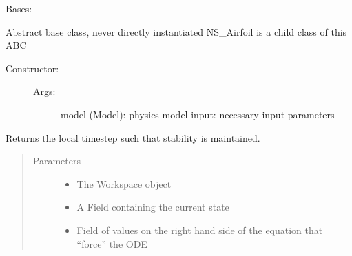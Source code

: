 \documentclass[letterpaper,10pt,english]{sphinxmanual}
\begin{document}
\begin{fulllineitems}
\label{\detokenize{autoapi/Integrator/index:Integrator.Integrator}}
\sphinxAtStartPar
Bases: 

\sphinxAtStartPar
Abstract base class, never directly instantiated
NS\_Airfoil is a child class of this ABC
\begin{description}
\item[{Constructor:}] \leavevmode\begin{description}
\item[{Args:}] \leavevmode
\sphinxAtStartPar
model (Model): physics model
input: necessary input parameters

\end{description}

\end{description}

\begin{fulllineitems}
\label{\detokenize{autoapi/Integrator/index:Integrator.Integrator.step}}
\sphinxAtStartPar
Returns the local timestep such that stability is maintained.
\begin{quote}\begin{description}
\item[{Parameters}] \leavevmode\begin{itemize}
\item {} 
\sphinxAtStartPar
{} \textendash{} The Workspace object

\item {} 
\sphinxAtStartPar
{} \textendash{} A Field containing the current state

\item {} 
\sphinxAtStartPar
{} \textendash{} Field of values on the right hand side of the equation that “force” the ODE

\end{itemize}

\end{description}\end{quote}

\end{fulllineitems}


\end{fulllineitems}
\end{document}
